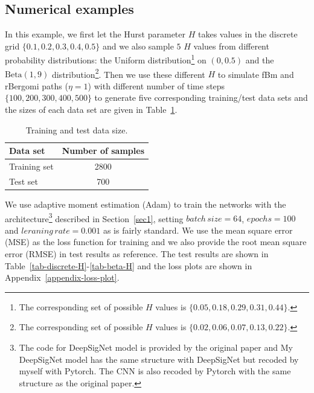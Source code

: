 \documentclass[]{article}
\renewcommand{\(}{\left(}
\renewcommand{\)}{\right)}
\begin{document}
	\subsection{Numerical examples}
	In this example, we first let the Hurst parameter $H$ takes values in the discrete grid $\{0.1, 0.2, 0.3, 0.4, 0.5\}$ and we also sample $5$ $H$ values from different probability distributions: the Uniform distribution\footnote{The corresponding set of possible $H$ values is $\{0.05, 0.18, 0.29, 0.31, 0.44\}$.} on $(0,0.5)$ and the $\text{Beta}(1, 9)$ distribution\footnote{The corresponding set of possible $H$ values is $\{0.02, 0.06, 0.07, 0.13, 0.22\}$.}. Then we use these different $H$ to simulate fBm and rBergomi paths ($\eta=1$) with different number of time steps $\{100,200,300,400,500\}$ to generate five corresponding training/test data sets and the sizes of each data set are given in Table~\ref{tab-H-datasize}. 
	\begin{table}[H]
		\caption{Training and test data size.}
		\label{tab-H-datasize}
		\smallskip
		\centering
		\renewcommand\arraystretch{1.5}
		\begin{tabular}{l c}
			\toprule
			Data set&Number of samples\\
			\hline
			Training set&2800\\
			Test set&700\\	
			\bottomrule
		\end{tabular}
	\end{table}
	We use adaptive moment estimation (Adam) to train the networks with the architecture\footnote{The code for DeepSigNet model is provided by the original paper and My DeepSigNet model has the same structure with DeepSigNet but recoded by myself with Pytorch. The CNN is also recoded by Pytorch with the same structure as the original paper.} described in Section~\ref{sec1}, setting $batch\, size=64$, $epochs=100$ and $leraning\,rate=0.001$ as is fairly standard. We use the mean square error (MSE) as the loss function for training and we also provide the root mean square error (RMSE) in test results as reference. The test results are shown in Table~\ref{tab-discrete-H}-\ref{tab-beta-H} and the loss plots are shown in Appendix~\ref{appendix-loss-plot}.
	
\end{document}
